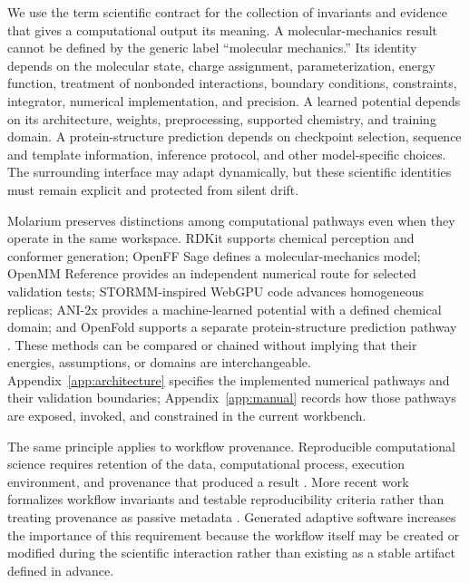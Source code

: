 \documentclass[11pt]{article}
\begin{document}
We use the term scientific contract for the collection of invariants and evidence that gives a computational output its meaning. A molecular-mechanics result cannot be defined by the generic label ``molecular mechanics.'' Its identity depends on the molecular state, charge assignment, parameterization, energy function, treatment of nonbonded interactions, boundary conditions, constraints, integrator, numerical implementation, and precision. A learned potential depends on its architecture, weights, preprocessing, supported chemistry, and training domain. A protein-structure prediction depends on checkpoint selection, sequence and template information, inference protocol, and other model-specific choices. The surrounding interface may adapt dynamically, but these scientific identities must remain explicit and protected from silent drift.

Molarium preserves distinctions among computational pathways even when they operate in the same workspace. RDKit supports chemical perception and conformer generation; OpenFF Sage defines a molecular-mechanics model; OpenMM Reference provides an independent numerical route for selected validation tests; STORMM-inspired WebGPU code advances homogeneous replicas; ANI-2x provides a machine-learned potential with a defined chemical domain; and OpenFold supports a separate protein-structure prediction pathway \citep{riniker2015etkdg,boothroyd2023sage,eastman2024openmm8,cerutti2024stormm,devereux2020ani2x,ahdritz2024openfold}. These methods can be compared or chained without implying that their energies, assumptions, or domains are interchangeable. Appendix~\ref{app:architecture} specifies the implemented numerical pathways and their validation boundaries; Appendix~\ref{app:manual} records how those pathways are exposed, invoked, and constrained in the current workbench.

The same principle applies to workflow provenance. Reproducible computational science requires retention of the data, computational process, execution environment, and provenance that produced a result \citep{cohenboulakia2017workflows,wilkinson2016fair}. More recent work formalizes workflow invariants and testable reproducibility criteria rather than treating provenance as passive metadata \citep{pritchard2025reproducibility}. Generated adaptive software increases the importance of this requirement because the workflow itself may be created or modified during the scientific interaction rather than existing as a stable artifact defined in advance.
\end{document}
